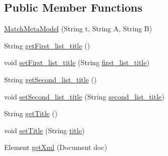 \subsection*{Public Member Functions}
\begin{DoxyCompactItemize}
\item 
\hyperlink{classorg_1_1buildmlearn_1_1toolkit_1_1templates_1_1MatchMetaModel_aba48c95a19c9bed282511d0627ca8e14}{Match\+Meta\+Model} (String t, String A, String B)
\item 
String \hyperlink{classorg_1_1buildmlearn_1_1toolkit_1_1templates_1_1MatchMetaModel_a06d155ec9939c5d59691941c6f948cbd}{get\+First\+\_\+list\+\_\+title} ()
\item 
void \hyperlink{classorg_1_1buildmlearn_1_1toolkit_1_1templates_1_1MatchMetaModel_afba112471fbd7b4b25afb289444a6536}{set\+First\+\_\+list\+\_\+title} (String \hyperlink{classorg_1_1buildmlearn_1_1toolkit_1_1templates_1_1MatchMetaModel_aa911346ed99166f949387781a6480618}{first\+\_\+list\+\_\+title})
\item 
String \hyperlink{classorg_1_1buildmlearn_1_1toolkit_1_1templates_1_1MatchMetaModel_ad4510b94692cc1e0e102c8d8463d0aa2}{get\+Second\+\_\+list\+\_\+title} ()
\item 
void \hyperlink{classorg_1_1buildmlearn_1_1toolkit_1_1templates_1_1MatchMetaModel_a667845b74aee2ac22096267edcc434c5}{set\+Second\+\_\+list\+\_\+title} (String \hyperlink{classorg_1_1buildmlearn_1_1toolkit_1_1templates_1_1MatchMetaModel_ac94b3ae40c469587ef02351201f71040}{second\+\_\+list\+\_\+title})
\item 
String \hyperlink{classorg_1_1buildmlearn_1_1toolkit_1_1templates_1_1MatchMetaModel_ab42c5489c48b17a419deaa3b7a4189c5}{get\+Title} ()
\item 
void \hyperlink{classorg_1_1buildmlearn_1_1toolkit_1_1templates_1_1MatchMetaModel_ab4c56f2d887ac4ba4413cbcba18be1ca}{set\+Title} (String \hyperlink{classorg_1_1buildmlearn_1_1toolkit_1_1templates_1_1MatchMetaModel_af8bb459139f9fc8fe759c8c3e3060c51}{title})
\item 
Element \hyperlink{classorg_1_1buildmlearn_1_1toolkit_1_1templates_1_1MatchMetaModel_af4907114f4141a71c264ecae5710c3dd}{get\+Xml} (Document doc)
\end{DoxyCompactItemize}

